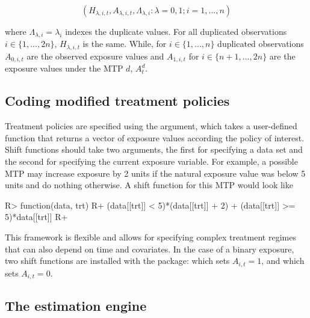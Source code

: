 \documentclass[]{jss}
\begin{document}
\begin{equation}
(H_{\lambda, i, t}, A_{\lambda, i, t}, \Lambda_{\lambda, i} : \lambda = 0, 1; i = 1, ..., n)
\end{equation}

where \(\Lambda_{\lambda, i} = \lambda_i\) indexes the duplicate values.
For all duplicated observations \(i \in \{1, ..., 2n\}\),
\(H_{\lambda, i, t}\) is the same. While, for \(i \in \{1, ..., n\}\)
duplicated observations \(A_{0, i, t}\) are the observed exposure values
and \(A_{1, i, t}\) for \(i \in \{n+1, ..., 2n\}\) are the exposure
values under the MTP \(d\), \(A^{d}_t\).

\hypertarget{coding-modified-treatment-policies}{%
\subsection{Coding modified treatment
policies}\label{coding-modified-treatment-policies}}

Treatment policies are specified using the  argument, which
takes a user-defined function that returns a vector of exposure values
according the policy of interest. Shift functions should take two
arguments, the first for specifying a data set and the second for
specifying the current exposure variable. For example, a possible MTP
may increase exposure by 2 units if the natural exposure value was below
5 units and do nothing otherwise. A shift function for this MTP would
look like

\begin{CodeChunk}

\begin{CodeInput}
R> function(data, trt) {
R+  (data[[trt]] < 5)*(data[[trt]] + 2) + (data[[trt]] >= 5)*data[[trt]]
R+ }
\end{CodeInput}

\end{CodeChunk}

This framework is flexible and allows for specifying complex treatment
regimes that can also depend on time and covariates. In the case of a
binary exposure, two shift functions are installed with
the package:  which sets \(A_{i, t} = 1\), and
 which sets \(A_{i, t} = 0\).

\hypertarget{the-estimation-engine}{%
\subsection{The estimation engine}\label{the-estimation-engine}}
\end{document}
